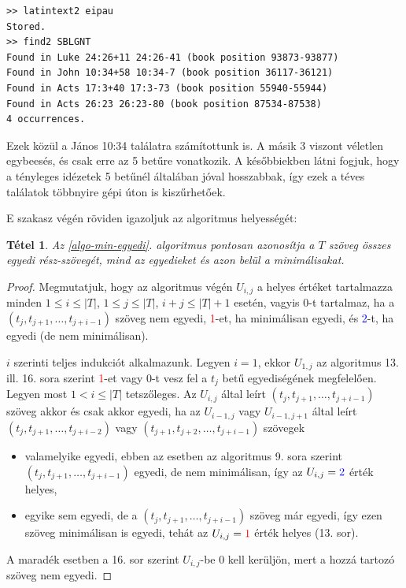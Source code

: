 \documentclass{article}
\newtheorem{theorem}{Tétel}
\begin{document}
\begin{lstlisting}
>> latintext2 eipau
Stored.
>> find2 SBLGNT 
Found in Luke 24:26+11 24:26-41 (book position 93873-93877)
Found in John 10:34+58 10:34-7 (book position 36117-36121)
Found in Acts 17:3+40 17:3-73 (book position 55940-55944)
Found in Acts 26:23 26:23-80 (book position 87534-87538)
4 occurrences.
\end{lstlisting}

Ezek közül a János 10:34 találatra számítottunk is. A másik 3 viszont véletlen egybeesés,
és csak erre az 5 betűre vonatkozik.
A későbbiekben látni fogjuk, hogy a tényleges idézetek 5 betűnél általában jóval hosszabbak,
így ezek a téves találatok többnyire gépi úton is kiszűrhetőek.

E szakasz végén röviden igazoljuk az algoritmus helyességét:
\begin{theorem}
Az \ref{algo-min-egyedi}. algoritmus pontosan azonosítja a $T$ szöveg összes egyedi rész-szövegét,
mind az egyedieket és azon belül a minimálisakat.
\end{theorem}
\begin{proof}
Megmutatjuk, hogy az algoritmus végén $U_{i,j}$ a helyes értéket
tartalmazza minden $1\leq i\leq |T|$, $1\leq j\leq |T|$, $i+j\leq |T|+1$ esetén,
vagyis 0-t tartalmaz, ha a $(t_j,t_{j+1},\ldots,t_{j+i-1})$ szöveg nem egyedi,
\textcolor{red}{1}-et, ha minimálisan egyedi, és \textcolor{blue}{2}-t, ha egyedi (de nem minimálisan).

$i$ szerinti teljes indukciót alkalmazunk. Legyen $i=1$, ekkor $U_{1,j}$ az algoritmus
13. ill. 16. sora szerint \textcolor{red}{1}-et vagy 0-t vesz fel a $t_j$ betű egyediségének
megfelelően. Legyen most $1<i\leq |T|$ tetszőleges. Az $U_{i,j}$ által leírt
$(t_j,t_{j+1},\ldots,t_{j+i-1})$ szöveg akkor és csak akkor
egyedi, ha az $U_{i-1,j}$ vagy $U_{i-1,j+1}$ által leírt
$(t_j,t_{j+1},\ldots,t_{j+i-2})$ vagy $(t_{j+1},t_{j+2},\ldots,t_{j+i-1})$
szövegek
\begin{itemize}
\item valamelyike egyedi, ebben az esetben az algoritmus 9. sora szerint
$(t_j,t_{j+1},\ldots,t_{j+i-1})$ egyedi, de nem minimálisan, így
az $U_{i,j}=\textcolor{blue}{2}$ érték helyes,
\item egyike sem egyedi, de a $(t_j,t_{j+1},\ldots,t_{j+i-1})$ szöveg már egyedi,
így ezen szöveg minimálisan is egyedi, tehát az $U_{i,j}=\textcolor{red}{1}$
érték helyes (13. sor).
\end{itemize}
A maradék esetben a 16. sor szerint $U_{i,j}$-be 0 kell kerüljön, mert a
hozzá tartozó szöveg nem egyedi.
\end{proof}
\end{document}
